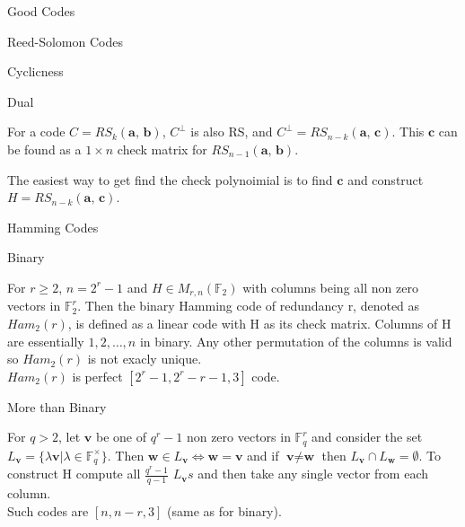 \documentclass[12pt, letterpaper]{article}
\newcommand{\F}{\mathbb{F}}
\begin{document}
\begin{section}{Good Codes}
\begin{subsection}{Reed-Solomon Codes}
\begin{subsubsection}{Cyclicness}
    \end{subsubsection}

    \begin{subsubsection}{Dual}

      For a code \(C = RS_{k}(\textbf{a, b})\), \(C^{\bot}\) is also RS, and
      \(C^{\bot} = RS_{n - k}(\textbf{a, c})\). This \(\textbf{c}\) can be found
      as a \(1 \times n\) check matrix for \(RS_{n - 1}(\textbf{a, b})\).

      The easiest way to get find the check polynoimial is to find
      \(\textbf{c}\) and construct \(H = RS_{n - k}(\textbf{a, c})\).

    \end{subsubsection}

  \end{subsection}

  \begin{subsection}{Hamming Codes}

    \begin{subsubsection}{Binary}

      For \(r \geq 2\), \(n = 2^{r} - 1\) and \(H \in M_{r, n}(\F_{2})\) with
      columns being all non zero vectors in \(\F^{r}_{2}\). Then the binary
      Hamming code of redundancy r, denoted as \(Ham_{2}(r)\), is defined as a
      linear code with  H as its check matrix. Columns of H are essentially
      \(1, 2, \dots , n\) in binary. Any other permutation of the columns is
      valid so \(Ham_{2}(r)\) is not exacly unique. \\
      \(Ham_{2}(r)\) is perfect \([2^{r} - 1, 2^{r} - r - 1, 3]\) code.

    \end{subsubsection}

    \begin{subsubsection}{More than Binary}

      For \(q > 2\), let \(\textbf{v}\) be one of \(q^{r} - 1\) non zero vectors
      in \(\F^{r}_{q}\) and consider the set \(L_{\textbf{v}} =
      \{ \lambda \textbf{v} | \lambda \in \F^{\times}_{q} \}\). Then
      \(\textbf{w} \in L_{\textbf{v}} \iff \textbf{w} = \textbf{v}\) and if
      \(\textbf{v} \neq \textbf{w}\) then \(L_{\textbf{v}} \cap L_{\textbf{w}}
      = \emptyset\). To construct H compute all \(\frac{q^{r} - 1}{q - 1}\)
      \(L_{\textbf{v}}s\) and then take any single vector from each column. \\
      Such codes are \([n, n - r, 3]\) (same as for binary).

    \end{subsubsection}

  \end{subsection}

\end{section}
\end{document}
